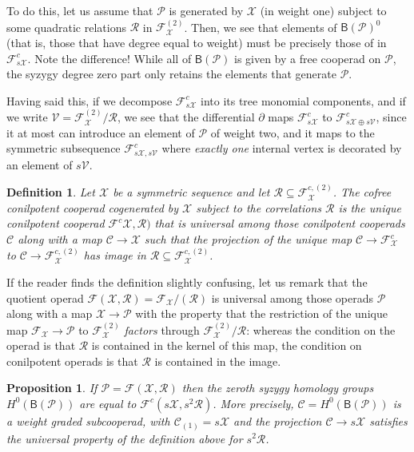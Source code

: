 \documentclass[fleqn, a4paper, twoside]{article}
\newcommand{\0}{\langle 0\rangle}
\newcommand{\XX}{\mathcal{X}}
\newcommand{\RR}{\mathcal{R}}
\newcommand{\FF}{\mathcal{F}}
\newcommand{\B}[1]{\mathsf{B}(#1)}
\DeclareRobustCommand{\[}{\begin{equation}}%
\DeclareRobustCommand{\]}{\end{equation}}%
\theoremstyle{mytheorem}
\newtheorem{proposition}[theorem]{Proposition}
\theoremstyle{introthm}
\theoremstyle{mydefinition}
\newtheorem{definition}[theorem]{Definition}
\theoremstyle{mydefinition2}
\theoremstyle{plain} %
\newcommand{\CC}{\mathcal{C}}
\newcommand{\?}{\,?\,}
\newcommand{\PP}{{\mathcal{P}}}
\theoremstyle{mytheorem}
\theoremstyle{plain} %
\begin{document}
To do this, let us assume that $\PP$ is generated by 
$\XX$ (in weight one) subject to some quadratic relations $\RR$ in 
$\FF_\XX^{(2)}$. Then, we see that elements of $\B{\PP}^0$ 
(that is, those that have degree equal to weight) must
be precisely those of in $\FF^c_{s\XX}$. Note the difference!
While all of $\B{\PP}$ is given by a free cooperad on $\PP$,
the syzygy degree zero part only retains the elements 
that generate $\PP$. 

Having said this, if we decompose 
$\FF_{s\XX}^c$ into its tree monomial components, and
if we write $\mathcal V = \FF_\XX^{(2)} / \RR$,
we see
that the differential $\partial$ maps $\FF_{s\XX}^c$ to
$\FF_{s\XX\oplus s\mathcal V}^c$, since it at
most can introduce an element of $\PP$ of weight two,
and it maps to the symmetric subsequence
$\FF_{s\XX,s\mathcal V}^c$ where
\emph{exactly one} internal vertex is decorated by an 
element of $s\mathcal V$. 

\begin{definition}
Let $\XX$ be a symmetric sequence and let $\RR\subseteq \FF_\XX^{c,(2)}$.
The cofree conilpotent cooperad cogenerated by $\XX$ subject
to the correlations $\RR$ is the unique conilpotent cooperad $\FF^c\XX,\RR)$
that is universal among those conilpotent cooperads
$\CC$ along with a map $\CC\longrightarrow \XX$ such
that the projection of the unique map $\CC \longrightarrow \FF_\XX^c$
to $\CC \longrightarrow \FF_\XX^{c,(2)}$ has image in
$\RR\subseteq \FF_\XX^{c,(2)}$. 
\end{definition}

If the reader finds the definition slightly confusing, let us remark
that the quotient operad $\FF(\XX,\RR) = \FF_\XX/ (\RR)$ is universal
among those operads $\PP$ along with a map $\XX\longrightarrow \PP$
with the property that the restriction of the unique map 
$\FF_\XX\longrightarrow \PP$ to $\FF_\XX^{(2)}$ \emph{factors}
through $\FF_\XX^{(2)}/\RR$: whereas the condition on the operad is
that $\RR$ is contained in the kernel of this map, the condition
on conilpotent operads is that $\RR$ is contained in the image. 

\begin{proposition}
If $\PP  = \FF(\XX,\RR)$ then the zeroth
syzygy homology groups $H^0(\B{\PP})$ are equal to $\FF^c(s\XX,s^2\RR)$.
More precisely, $\CC = H^0(\B{\PP})$ is a weight graded subcooperad,
with $\CC_{(1)} = s\XX$ and the projection $\CC \longrightarrow s\XX$
satisfies the universal property of the definition above for $s^2\RR$.
\end{proposition}
\end{document}

